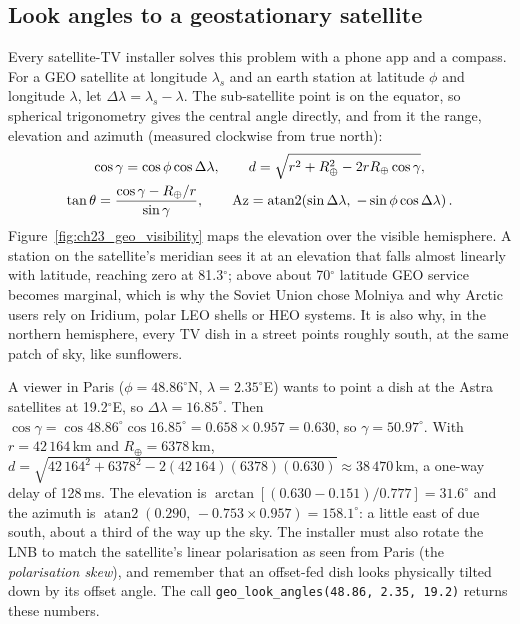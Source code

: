 
\subsection{Look angles to a geostationary satellite}

Every satellite-TV installer solves this problem with a phone app and a compass. For a GEO
satellite at longitude $\lambda_s$ and an earth station at latitude $\phi$ and longitude $\lambda$,
let $\Delta\lambda=\lambda_s-\lambda$. The sub-satellite point is on the equator, so spherical
trigonometry gives the central angle directly, and from it the range, elevation and azimuth
(measured clockwise from true north):
\begin{gather}
\cos\gamma=\cos\phi\cos\Delta\lambda,\qquad
d=\sqrt{r^2+R_\oplus^2-2rR_\oplus\cos\gamma},\notag\\
\tan\theta=\frac{\cos\gamma-R_\oplus/r}{\sin\gamma},\qquad
\text{Az}=\operatorname{atan2}\!\left(\sin\Delta\lambda,\;-\sin\phi\cos\Delta\lambda\right).
\label{eq:ch23:lookangles}
\end{gather}
Figure~\ref{fig:ch23_geo_visibility} maps the elevation over the visible hemisphere. A station
on the satellite's meridian sees it at an elevation that falls almost linearly with latitude,
reaching zero at 81.3$^\circ$; above about 70$^\circ$ latitude GEO service becomes marginal,
which is why the Soviet Union chose Molniya and why Arctic users rely on Iridium, polar LEO
shells or HEO systems. It is also why, in the northern hemisphere, every TV dish in a street
points roughly south, at the same patch of sky, like sunflowers.


\begin{worked}
A viewer in Paris ($\phi=48.86^\circ$N, $\lambda=2.35^\circ$E) wants to point a dish at the
Astra satellites at 19.2$^\circ$E, so $\Delta\lambda=16.85^\circ$.
Then $\cos\gamma=\cos48.86^\circ\cos16.85^\circ=0.658\times0.957=0.630$, so $\gamma=50.97^\circ$.
With $r=42\,164$\,km and $R_\oplus=6378$\,km,
$d=\sqrt{42\,164^2+6378^2-2(42\,164)(6378)(0.630)}\approx38\,470$\,km, a one-way delay of
128\,ms. The elevation is $\arctan[(0.630-0.151)/0.777]=31.6^\circ$ and the azimuth is
$\operatorname{atan2}(0.290,\,-0.753\times0.957)=158.1^\circ$: a little east of due south, about
a third of the way up the sky. The installer must also rotate the LNB to match the satellite's
linear polarisation as seen from Paris (the \emph{polarisation skew}), and remember that an
offset-fed dish looks physically tilted down by its offset angle. The call
\texttt{geo\_look\_angles(48.86, 2.35, 19.2)} returns these numbers.
\end{worked}

